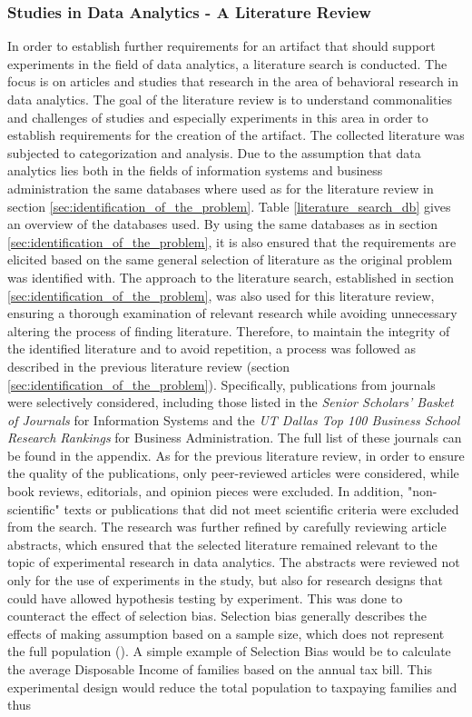 \subsubsection{Studies in Data Analytics - A Literature Review }\label{subsec:literature_review_requirements}

In order to establish further requirements for an artifact that should support experiments in the field of data analytics, a literature search is conducted. The focus is on articles and studies that research in the area of behavioral research in data analytics. The goal of the literature review is to understand commonalities and challenges of studies and especially experiments in this area in order to establish requirements for the creation of the artifact. The collected literature was subjected to categorization and analysis. Due to the assumption that data analytics lies both in the fields of information systems and business administration the same databases where used as for the literature review in section \ref{sec:identification_of_the_problem}. Table \ref{literature_search_db} gives an overview of the databases used. By using the same databases as in section \ref{sec:identification_of_the_problem}, it is also ensured that the requirements are elicited based on the same general selection of literature as the original problem was identified with. The approach to the literature search, established in section \ref{sec:identification_of_the_problem}, was also used for this literature review, ensuring a thorough examination of relevant research while avoiding unnecessary altering the process of finding literature. Therefore, to maintain the integrity of the identified literature and to avoid repetition, a process was followed as described in the previous literature review (section \ref{sec:identification_of_the_problem}). Specifically, publications from journals were selectively considered, including those listed in the \textit{Senior Scholars' Basket of Journals} for Information Systems and the \textit{UT Dallas Top 100 Business School Research Rankings} for Business Administration. The full list of these journals can be found in the appendix. As for the previous literature review, in order to ensure the quality of the publications, only peer-reviewed articles were considered, while book reviews, editorials, and opinion pieces were excluded. In addition, "non-scientific" texts or publications that did not meet scientific criteria were excluded from the search. The research was further refined by carefully reviewing article abstracts, which ensured that the selected literature remained relevant to the topic of experimental research in data analytics. The abstracts were reviewed not only for the use of experiments in the study, but also for research designs that could have allowed hypothesis testing by experiment. This was done to counteract the effect of selection bias. Selection bias generally describes the effects of making assumption based on a sample size, which does not represent the full population (\cite{Heckman.2010}). A simple example of Selection Bias would be to calculate the average Disposable Income of families based on the annual tax bill. This experimental design would reduce the total population to taxpaying families and thus 